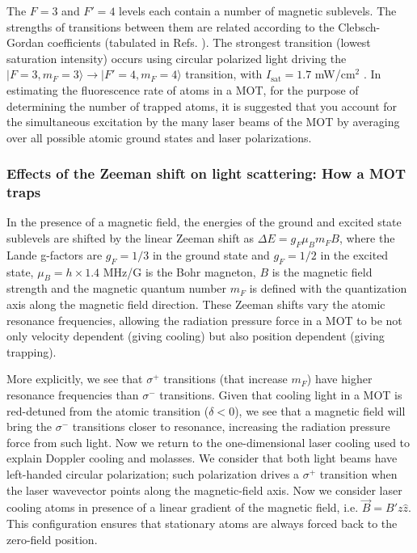 \documentclass{../lab}
\begin{document}
The $F = 3$ and $F' = 4$ levels each contain a number of magnetic sublevels. The strengths of transitions between them are related according to the Clebsch-Gordan coefficients (tabulated in Refs. \cite{Metcalf,Steck}). The strongest transition (lowest saturation intensity) occurs using circular polarized light driving the $|F = 3, m_F = 3\rangle \rightarrow |F' = 4, m_F = 4\rangle$ transition, with $ I_\text{sat} = 1.7$ mW/cm$^2$ \cite{Steck}. In estimating the fluorescence rate of atoms in a MOT, for the purpose of determining the number of trapped atoms, it is suggested that you account for the simultaneous excitation by the many laser beams of the MOT by averaging over all possible atomic ground states and laser polarizations.

\subsubsection {Effects of the Zeeman shift on light scattering: How a MOT traps}

In the presence of a magnetic field, the energies of the ground and excited state sublevels are shifted by the linear Zeeman shift as $\Delta E = g_F\mu_Bm_FB$, where the Lande g-factors are $ g_F = 1/3$ in the ground state and $ g_F = 1/2$ in the excited state, $\mu_B = h \times 1.4$ MHz/G is the Bohr magneton, $ B$ is the magnetic field strength and the magnetic quantum number $ m_F$ is defined with the quantization axis along the magnetic field direction. These Zeeman shifts vary the atomic resonance frequencies, allowing the radiation pressure force in a MOT to be not only velocity dependent (giving cooling) but also position dependent (giving trapping).

More explicitly, we see that $\sigma^+$ transitions (that increase $m_F$) have higher resonance frequencies than $\sigma^-$ transitions. Given that cooling light in a MOT is red-detuned from the atomic transition ($\delta <0$), we see that a magnetic field will bring the $\sigma^-$ transitions closer to resonance, increasing the radiation pressure force from such light. Now we return to the one-dimensional laser cooling used to explain Doppler cooling and molasses. We consider that both light beams have left-handed circular polarization; such polarization drives a $\sigma^+$ transition when the laser wavevector points along the magnetic-field axis. Now we consider laser cooling atoms in presence of a linear gradient of the magnetic field, i.e. $\vec{B} = B'z\hat{z}$. This configuration ensures that stationary atoms are always forced back to the zero-field position.
\end{document}

